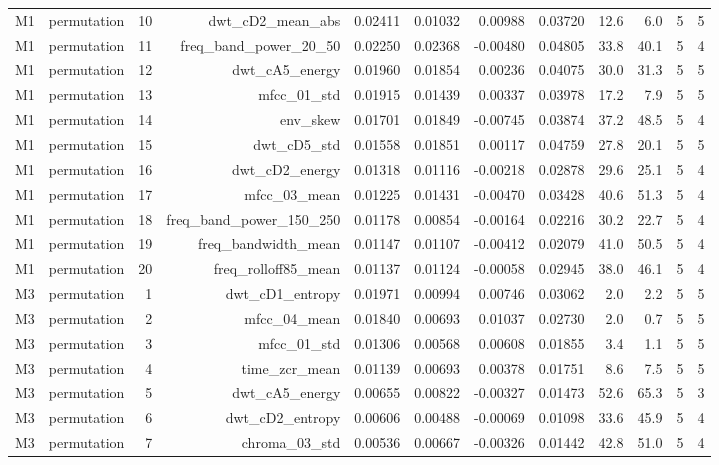 \begin{table}[htbp]
\begin{tabular}{lrrrrrrrrrrr}
    M1 & permutation & 10 & dwt\_cD2\_mean\_abs & 0.02411 & 0.01032 & 0.00988 & 0.03720 & 12.6 & 6.0 & 5 & 5 \\
    M1 & permutation & 11 & freq\_band\_power\_20\_50 & 0.02250 & 0.02368 & -0.00480 & 0.04805 & 33.8 & 40.1 & 5 & 4 \\
    M1 & permutation & 12 & dwt\_cA5\_energy & 0.01960 & 0.01854 & 0.00236 & 0.04075 & 30.0 & 31.3 & 5 & 5 \\
    M1 & permutation & 13 & mfcc\_01\_std & 0.01915 & 0.01439 & 0.00337 & 0.03978 & 17.2 & 7.9 & 5 & 5 \\
    M1 & permutation & 14 & env\_skew & 0.01701 & 0.01849 & -0.00745 & 0.03874 & 37.2 & 48.5 & 5 & 4 \\
    M1 & permutation & 15 & dwt\_cD5\_std & 0.01558 & 0.01851 & 0.00117 & 0.04759 & 27.8 & 20.1 & 5 & 5 \\
    M1 & permutation & 16 & dwt\_cD2\_energy & 0.01318 & 0.01116 & -0.00218 & 0.02878 & 29.6 & 25.1 & 5 & 4 \\
    M1 & permutation & 17 & mfcc\_03\_mean & 0.01225 & 0.01431 & -0.00470 & 0.03428 & 40.6 & 51.3 & 5 & 4 \\
    M1 & permutation & 18 & freq\_band\_power\_150\_250 & 0.01178 & 0.00854 & -0.00164 & 0.02216 & 30.2 & 22.7 & 5 & 4 \\
    M1 & permutation & 19 & freq\_bandwidth\_mean & 0.01147 & 0.01107 & -0.00412 & 0.02079 & 41.0 & 50.5 & 5 & 4 \\
    M1 & permutation & 20 & freq\_rolloff85\_mean & 0.01137 & 0.01124 & -0.00058 & 0.02945 & 38.0 & 46.1 & 5 & 4 \\
    M3 & permutation & 1 & dwt\_cD1\_entropy & 0.01971 & 0.00994 & 0.00746 & 0.03062 & 2.0 & 2.2 & 5 & 5 \\
    M3 & permutation & 2 & mfcc\_04\_mean & 0.01840 & 0.00693 & 0.01037 & 0.02730 & 2.0 & 0.7 & 5 & 5 \\
    M3 & permutation & 3 & mfcc\_01\_std & 0.01306 & 0.00568 & 0.00608 & 0.01855 & 3.4 & 1.1 & 5 & 5 \\
    M3 & permutation & 4 & time\_zcr\_mean & 0.01139 & 0.00693 & 0.00378 & 0.01751 & 8.6 & 7.5 & 5 & 5 \\
    M3 & permutation & 5 & dwt\_cA5\_energy & 0.00655 & 0.00822 & -0.00327 & 0.01473 & 52.6 & 65.3 & 5 & 3 \\
    M3 & permutation & 6 & dwt\_cD2\_entropy & 0.00606 & 0.00488 & -0.00069 & 0.01098 & 33.6 & 45.9 & 5 & 4 \\
    M3 & permutation & 7 & chroma\_03\_std & 0.00536 & 0.00667 & -0.00326 & 0.01442 & 42.8 & 51.0 & 5 & 4 \\

\end{tabular}
\end{table}
